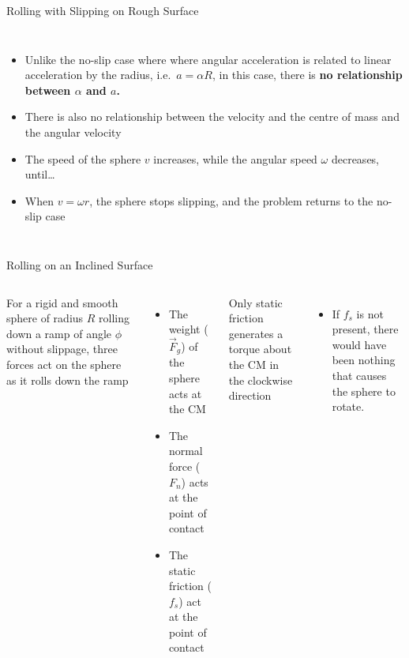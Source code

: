 \documentclass[12pt,compress,aspectratio=169]{beamer}
\begin{document}
\begin{frame}{Rolling with Slipping on Rough Surface}
  \begin{columns}
    

    \begin{itemize}
    \item Unlike the no-slip case where where angular acceleration is related
      to linear acceleration by the radius, i.e.\ $a=\alpha R$, in this case,
      there is \textbf{no relationship between $\alpha$ and $a$.}
    \item There is also no relationship between the velocity and the centre
      of mass and the angular velocity
    \item The speed of the sphere $v$ increases, while the angular speed
      $\omega$ decreases, until\ldots
    \item When $v=\omega r$, the sphere stops slipping, and the problem returns
      to the no-slip case
    \end{itemize}
  \end{columns}
\end{frame}



\begin{frame}{Rolling on an Inclined Surface}
  \begin{columns}
    

    For a rigid and smooth sphere of radius $R$ rolling down a ramp of angle
    $\phi$ without slippage, three forces act on the sphere as it rolls down
    the ramp
    \begin{itemize}
    \item The weight ($\vec F_g$) of the sphere acts at the CM
    \item The normal force ($F_n$) acts at the point of contact
    \item The static friction ($f_s$) act at the point of contact
    \end{itemize}
    Only static friction generates a torque about the CM in the clockwise
    direction
    \begin{itemize}
    \item If $f_s$ is not present, there would have been nothing that causes
      the sphere to rotate.
    \end{itemize}
  \end{columns}
\end{frame}
\end{document}
